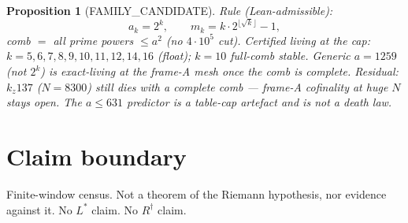 \documentclass[11pt]{article}
\newtheorem{prop}{Proposition}
\begin{document}
\begin{prop}[FAMILY\_CANDIDATE]\label{prop:fam}
Rule (Lean-admissible):
\[
a_k=2^k,\qquad
m_k=k\cdot 2^{\lfloor\sqrt k\rfloor}-1,
\]
comb $=$ all prime powers $\le a^{2}$
(no $4\cdot10^5$ cut).
Certified living at the cap:
$k=5,6,7,8,9,10,11,12,14,16$
(float); $k=10$ full-comb stable.
Generic $a=1259$ (not $2^k$) is exact-living
at the frame-A mesh once the comb is complete.
Residual: $k_z137$ ($N=8300$) still dies
with a complete comb --- frame-A cofinality
at huge $N$ stays open.
The $a\le 631$ predictor is a table-cap
artefact and is not a death law.
\end{prop}

\section{Claim boundary}

Finite-window census.  Not a theorem of the
Riemann hypothesis, nor evidence against it.
No $L^{*}$ claim.  No $R^{\dagger}$ claim.
\end{document}
